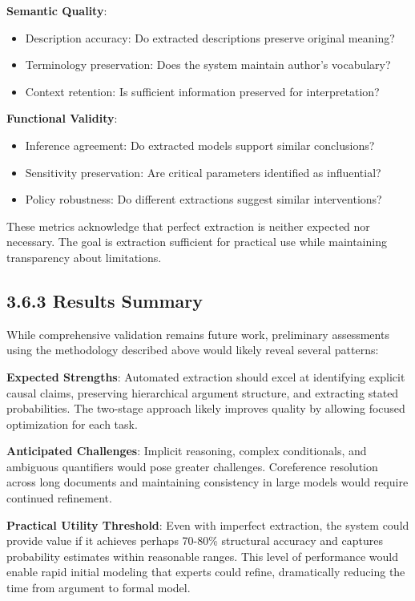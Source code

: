 \documentclass[
  11pt,
  letterpaper,
  openany]{book}
\providecommand{\tightlist}{%
  \setlength{\itemsep}{0pt}\setlength{\parskip}{0pt}}
\begin{document}
\textbf{Semantic Quality}:

\begin{itemize}
\tightlist
\item
  Description accuracy: Do extracted descriptions preserve original
  meaning?
\item
  Terminology preservation: Does the system maintain author's
  vocabulary?
\item
  Context retention: Is sufficient information preserved for
  interpretation?
\end{itemize}

\textbf{Functional Validity}:

\begin{itemize}
\tightlist
\item
  Inference agreement: Do extracted models support similar conclusions?
\item
  Sensitivity preservation: Are critical parameters identified as
  influential?
\item
  Policy robustness: Do different extractions suggest similar
  interventions?
\end{itemize}

These metrics acknowledge that perfect extraction is neither expected
nor necessary. The goal is extraction sufficient for practical use while
maintaining transparency about limitations.

\subsection{3.6.3 Results Summary}\label{sec-validation-results}

While comprehensive validation remains future work, preliminary
assessments using the methodology described above would likely reveal
several patterns:

\textbf{Expected Strengths}: Automated extraction should excel at
identifying explicit causal claims, preserving hierarchical argument
structure, and extracting stated probabilities. The two-stage approach
likely improves quality by allowing focused optimization for each task.

\textbf{Anticipated Challenges}: Implicit reasoning, complex
conditionals, and ambiguous quantifiers would pose greater challenges.
Coreference resolution across long documents and maintaining consistency
in large models would require continued refinement.

\textbf{Practical Utility Threshold}: Even with imperfect extraction,
the system could provide value if it achieves perhaps 70-80\% structural
accuracy and captures probability estimates within reasonable ranges.
This level of performance would enable rapid initial modeling that
experts could refine, dramatically reducing the time from argument to
formal model.
\end{document}
